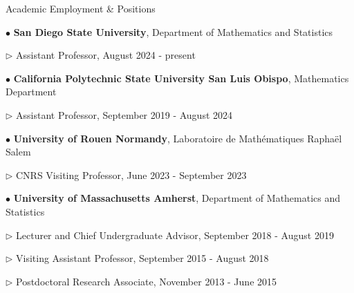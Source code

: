 \documentclass[10pt]{article} %
\newenvironment{outerlist}[1][\enskip\textbullet]%
        {\begin{itemize}[#1]}{\end{itemize}%
         \vspace{-.6\baselineskip}}
\newenvironment{innerlist}[1][\enskip\textbullet]%
        {\begin{compactitem}[#1]}{\end{compactitem}}
\begin{document}
\begin{section}{Academic Employment \& Positions}
\vspace{-6.9mm}
\begin{outerlist}
\item[$\bullet$]
\textbf{San Diego State University}, Department of Mathematics and Statistics
\begin{innerlist}
\item [$\triangleright$] Assistant Professor, August 2024 - present
\end{innerlist}
\item[$\bullet$]
\textbf{California Polytechnic State University San Luis Obispo}, Mathematics Department
\begin{innerlist}
\item [$\triangleright$] Assistant Professor, September 2019 - August 2024
\end{innerlist}
\item[$\bullet$]
\textbf{University of Rouen Normandy}, Laboratoire de Math\'ematiques Rapha\"el Salem
\begin{innerlist}
\item [$\triangleright$] CNRS Visiting Professor, June 2023 - September 2023
\end{innerlist}
\item[$\bullet$]
\textbf{University of Massachusetts Amherst}, Department of
Mathematics and Statistics
\begin{innerlist}
\item [$\triangleright$] Lecturer and Chief Undergraduate Advisor, September 2018 - August 2019
\item [$\triangleright$] Visiting Assistant Professor, September 2015 - August 2018
\item [$\triangleright$] Postdoctoral Research Associate, November 2013 - June 2015
\end{innerlist}

\end{outerlist}
\end{section}
\end{document}

